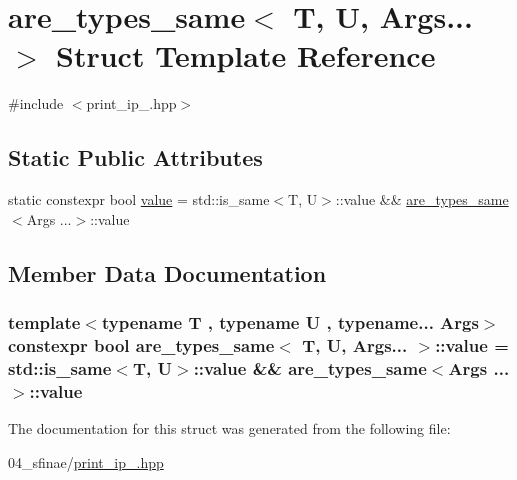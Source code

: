 \hypertarget{structare__types__same_3_01T_00_01U_00_01Args_8_8_8_01_4}{}\section{are\+\_\+types\+\_\+same$<$ T, U, Args... $>$ Struct Template Reference}
\label{structare__types__same_3_01T_00_01U_00_01Args_8_8_8_01_4}


{\ttfamily \#include $<$print\+\_\+ip\+\_.\+hpp$>$}

\subsection*{Static Public Attributes}
\begin{DoxyCompactItemize}
\item 
static constexpr bool \hyperlink{structare__types__same_3_01T_00_01U_00_01Args_8_8_8_01_4_af51bd83ec15e63c571c9bf036172c110}{value} = std\+::is\+\_\+same$<$T, U$>$\+::value \&\& \hyperlink{structare__types__same}{are\+\_\+types\+\_\+same}$<$Args ...$>$\+::value
\end{DoxyCompactItemize}


\subsection{Member Data Documentation}
\subsubsection[{\texorpdfstring{value}{value}}]{\setlength{\rightskip}{0pt plus 5cm}template$<$typename T , typename U , typename... Args$>$ constexpr bool {\bf are\+\_\+types\+\_\+same}$<$ T, U, Args... $>$\+::value = std\+::is\+\_\+same$<$T, U$>$\+::value \&\& {\bf are\+\_\+types\+\_\+same}$<$Args ...$>$\+::value\hspace{0.3cm}{\ttfamily [static]}}\hypertarget{structare__types__same_3_01T_00_01U_00_01Args_8_8_8_01_4_af51bd83ec15e63c571c9bf036172c110}{}\label{structare__types__same_3_01T_00_01U_00_01Args_8_8_8_01_4_af51bd83ec15e63c571c9bf036172c110}


The documentation for this struct was generated from the following file\+:\begin{DoxyCompactItemize}
\item 
04\+\_\+sfinae/\hyperlink{print__ip__04_8hpp}{print\+\_\+ip\+\_.\+hpp}\end{DoxyCompactItemize}
